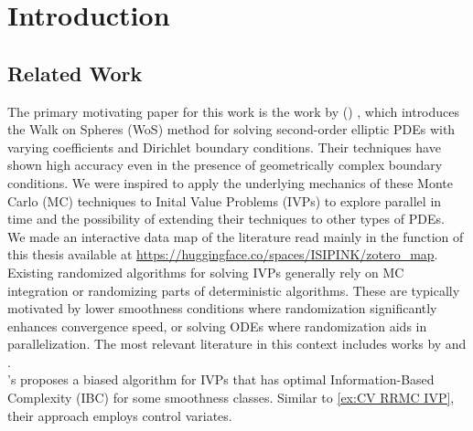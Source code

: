 \documentclass[a4paper,12pt]{article}
\begin{document}


\newpage
\tableofcontents
\newpage

\begin{abstract}
  
\end{abstract}


\section{Introduction}

\subsection{Related Work}
The primary motivating paper for this work is the work
by \citeauthor{sawhney_grid-free_2022}
(\citeyear{sawhney_grid-free_2022}) \cite{sawhney_grid-free_2022},
which introduces the Walk on Spheres (WoS) method for solving second-order
elliptic PDEs with varying coefficients and Dirichlet boundary conditions.
Their techniques have shown high accuracy even in the presence of geometrically
complex boundary conditions. We were inspired to apply the underlying
mechanics of these Monte Carlo (MC) techniques to Inital Value Problems (IVPs) to explore
parallel in time and the possibility of extending their techniques
to other types of PDEs. \\

We made an interactive data map of the literature read
mainly in the function of this thesis available at
\url{https://huggingface.co/spaces/ISIPINK/zotero_map}.\\

Existing randomized algorithms for solving IVPs generally rely on MC integration or randomizing parts
of deterministic algorithms. These are typically motivated by lower smoothness conditions where randomization
significantly enhances convergence speed, or solving ODEs where randomization aids in parallelization.
The most relevant literature in this context includes works by
\citeauthor{daun_randomized_2011} and \citeauthor{ermakov_monte_2021}. \\

\citeauthor{daun_randomized_2011}'s \citeyear{daun_randomized_2011} \cite{daun_randomized_2011}
proposes a biased algorithm for IVPs that has optimal Information-Based Complexity (IBC) for
some smoothness classes. Similar to \ref{ex:CV RRMC IVP}, their approach employs control variates. \\
\end{document}
